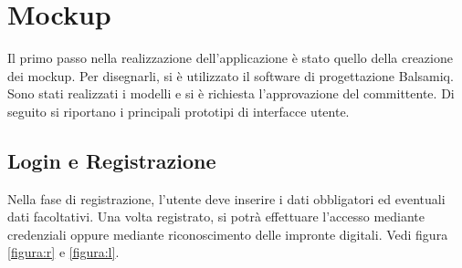 \documentclass[a4paper,final,12pt]{report}
\begin{document}
\section{Mockup}
Il primo passo nella realizzazione dell'applicazione è stato quello della creazione dei mockup. Per disegnarli, si è utilizzato il software di progettazione Balsamiq. Sono stati realizzati i modelli e si è richiesta l'approvazione del committente. Di seguito si riportano i principali prototipi di interfacce utente.

\newpage

\subsection{Login e Registrazione}
Nella fase di registrazione, l'utente deve inserire i dati obbligatori ed eventuali dati facoltativi. Una volta registrato, si potrà effettuare l'accesso mediante credenziali oppure mediante riconoscimento delle impronte digitali. Vedi figura \ref{figura:r} e \ref{figura:l}.
\end{document}
